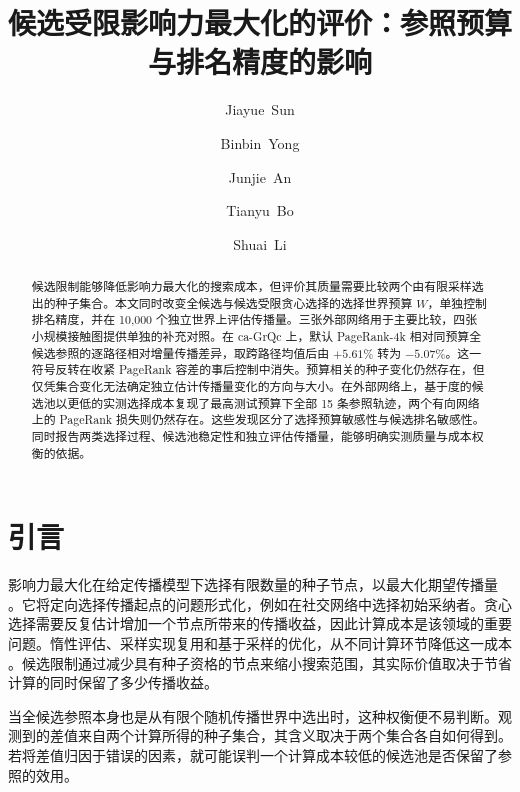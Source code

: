 \documentclass[smallextended]{svjour3}
\begin{document}
\def\abstractname{摘要}\def\keywordname{\textbf{关键词}}\def\figurename{图}\def\tablename{表}\def\refname{参考文献}
\title{候选受限影响力最大化的评价：参照预算与排名精度的影响}
\author{\mbox{Jiayue Sun} \and \mbox{Binbin Yong} \and \mbox{Junjie An} \and \mbox{Tianyu Bo} \and \mbox{Shuai Li}}
\date{}
\maketitle
\begin{abstract}
候选限制能够降低影响力最大化的搜索成本，但评价其质量需要比较两个由有限采样选出的种子集合。本文同时改变全候选与候选受限贪心选择的选择世界预算 $W$，单独控制排名精度，并在 10,000 个独立世界上评估传播量。三张外部网络用于主要比较，四张小规模接触图提供单独的补充对照。在 ca-GrQc 上，默认 PageRank-4k 相对同预算全候选参照的逐路径相对增量传播差异，取跨路径均值后由 $+5.61$\% 转为 $-5.07$\%。这一符号反转在收紧 PageRank 容差的事后控制中消失。预算相关的种子变化仍然存在，但仅凭集合变化无法确定独立估计传播量变化的方向与大小。在外部网络上，基于度的候选池以更低的实测选择成本复现了最高测试预算下全部 15 条参照轨迹，两个有向网络上的 PageRank 损失则仍然存在。这些发现区分了选择预算敏感性与候选排名敏感性。同时报告两类选择过程、候选池稳定性和独立评估传播量，能够明确实测质量与成本权衡的依据。
\end{abstract}

\section{引言}
影响力最大化在给定传播模型下选择有限数量的种子节点，以最大化期望传播量 \cite{ref1}。它将定向选择传播起点的问题形式化，例如在社交网络中选择初始采纳者。贪心选择需要反复估计增加一个节点所带来的传播收益，因此计算成本是该领域的重要问题。惰性评估、采样实现复用和基于采样的优化，从不同计算环节降低这一成本 \cite{ref7,ref8,ref2}。候选限制通过减少具有种子资格的节点来缩小搜索范围，其实际价值取决于节省计算的同时保留了多少传播收益。

当全候选参照本身也是从有限个随机传播世界中选出时，这种权衡便不易判断。观测到的差值来自两个计算所得的种子集合，其含义取决于两个集合各自如何得到。若将差值归因于错误的因素，就可能误判一个计算成本较低的候选池是否保留了参照的效用。
\end{document}
